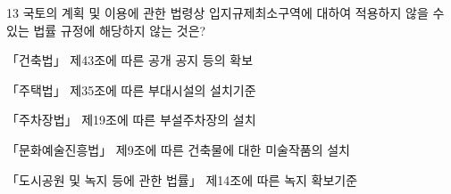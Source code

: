 \begin{question}{13}
국토의 계획 및 이용에 관한 법령상 입지규제최소구역에 대하여 적용하지 않을 수 있는 법률 규정에 해당하지 않는 것은?
\begin{choices}
  \item 「건축법」 제43조에 따른 공개 공지 등의 확보
  \item 「주택법」 제35조에 따른 부대시설의 설치기준
  \item 「주차장법」 제19조에 따른 부설주차장의 설치
  \item 「문화예술진흥법」 제9조에 따른 건축물에 대한 미술작품의 설치
  \item 「도시공원 및 녹지 등에 관한 법률」 제14조에 따른 녹지 확보기준
\end{choices}
\end{question}
